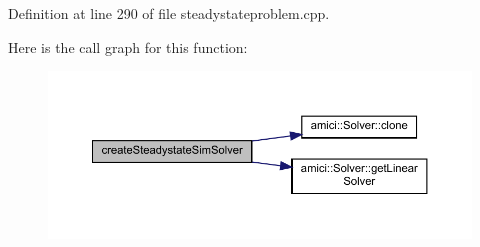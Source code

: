 Definition at line 290 of file steadystateproblem.\+cpp.

Here is the call graph for this function\+:
\nopagebreak
\begin{figure}[H]
\begin{center}
\leavevmode
\includegraphics[width=350pt]{classamici_1_1_steadystate_problem_a8e36c9f8f77bf820e7d6deb34007a47d_cgraph}
\end{center}
\end{figure}

